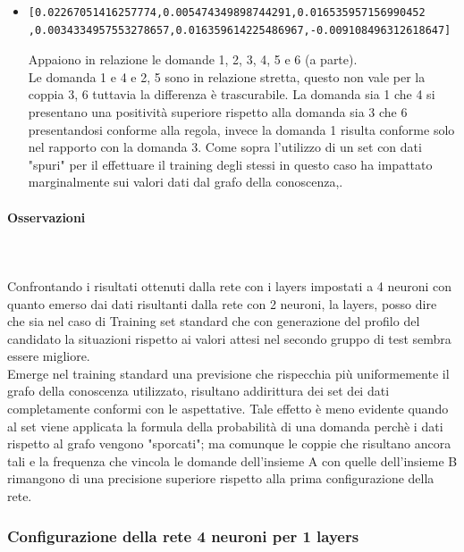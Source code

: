 \begin{itemize}
\item  \begin{verbatim}[0.02267051416257774,0.005474349898744291,0.016535957156990452
,0.0034334957553278657,0.016359614225486967,-0.009108496312618647]\end{verbatim}
Appaiono in relazione le domande 1, 2, 3, 4, 5  e 6 (a parte).\\
Le domanda 1 e 4 e 2, 5  sono in relazione stretta, questo non vale per la coppia 3, 6  tuttavia la differenza \`e trascurabile.
La domanda sia 1 che 4 si presentano una positivit\`a superiore rispetto alla domanda sia 3 che 6 presentandosi conforme alla regola, invece la domanda 1 risulta conforme solo nel rapporto con la domanda 3. Come sopra l'utilizzo di  un set con dati "spuri" per il effettuare il training degli stessi in questo caso ha impattato marginalmente sui valori dati dal grafo della conoscenza,.
\end{itemize}

\paragraph{Osservazioni}\mbox{}
\label{Osservazioni su rete a 2 neuroni}
\\\\
\noindent
Confrontando i risultati ottenuti dalla rete con i layers impostati a 4 neuroni con quanto emerso dai dati risultanti dalla  rete con 2 neuroni, la layers, posso dire che sia nel caso di Training set standard che con generazione del profilo del candidato la situazioni rispetto ai valori attesi nel secondo gruppo di test sembra essere migliore.\\
Emerge nel training standard una previsione che rispecchia pi\`u uniformemente il grafo della conoscenza utilizzato, risultano  addirittura dei set dei dati completamente conformi con le aspettative. Tale effetto \`e meno evidente quando al set viene applicata la formula della probabilit\`a di una domanda perch\`e i dati rispetto al grafo vengono "sporcati"; ma comunque le coppie che risultano ancora tali e la frequenza che vincola le domande dell'insieme A con quelle dell'insieme B rimangono di una precisione superiore rispetto alla prima configurazione della rete.


\subsubsection{Configurazione della rete 4 neuroni per 1 layers}
\label{Configurazione della rete 4 neuroni per 1 layers}

